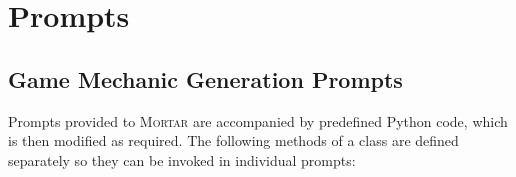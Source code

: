 \documentclass{article} %
\newcommand{\name}{\textsc{Mortar}}
\begin{document}



\appendix


\section{Prompts}
\label{appendixA}

\subsection{Game Mechanic Generation Prompts}

Prompts provided to \name{} are accompanied by predefined Python code, which is then modified as required. The following methods of a class are defined separately so they can be invoked in individual prompts:
\end{document}
